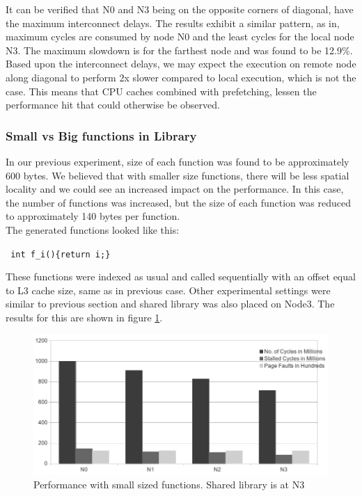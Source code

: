 It can be verified that N0 and N3 being on the opposite corners of diagonal, have the maximum interconnect delays.
The results exhibit a similar pattern, as in, maximum cycles are consumed by node N0 and the least cycles for the local node N3.
The maximum slowdown is for the farthest node and was found to be 12.9\%.
Based upon the interconnect delays, we may expect the execution on remote node along diagonal to perform 2x slower compared to local
execution, which is not the case. This means that CPU caches combined with prefetching, lessen the performance hit that
could otherwise be observed.

\subsubsection{Small vs Big functions in Library}

In our previous experiment, size of each function was found to be approximately 600 bytes. We believed that with smaller size
functions, there will be less spatial locality and we could see an increased impact on the performance. In this case, the number
of functions was increased, but the size of each function was reduced to approximately 140 bytes per function.\\
The generated functions looked like this:

\texttt{ int f_i()\{return i;\} }

These functions were indexed as usual and called sequentially with an offset equal to L3 cache size, same as in previous case.
Other experimental settings were similar to previous section and shared library was also placed on Node3.
The results for this are shown in figure \ref{fig:smallFunc}.

\begin{figure}
    \centering
    \includegraphics[scale=0.38]{smallFunc.png}
    \caption{Performance with small sized functions. Shared library is at N3 }
    \label{fig:smallFunc}
\end{figure}


